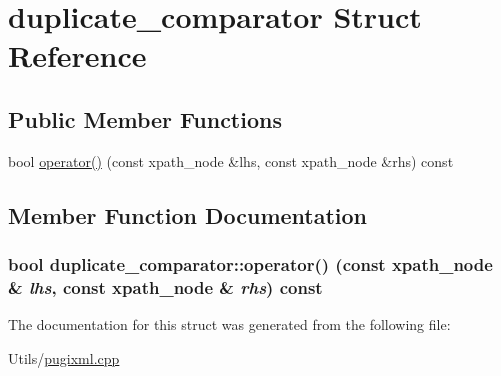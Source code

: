 \hypertarget{structduplicate__comparator}{
\section{duplicate\_\-comparator Struct Reference}
\label{structduplicate__comparator}
}
\subsection*{Public Member Functions}
\begin{CompactItemize}
\item 
bool \hyperlink{structduplicate__comparator_fa36b2cf7af3e0bc7e41b03995bd99d3}{operator()} (const xpath\_\-node \&lhs, const xpath\_\-node \&rhs) const 
\end{CompactItemize}


\subsection{Member Function Documentation}
\hypertarget{structduplicate__comparator_fa36b2cf7af3e0bc7e41b03995bd99d3}{
\subsubsection[operator()]{\setlength{\rightskip}{0pt plus 5cm}bool duplicate\_\-comparator::operator() (const xpath\_\-node \& {\em lhs}, const xpath\_\-node \& {\em rhs}) const}}
\label{structduplicate__comparator_fa36b2cf7af3e0bc7e41b03995bd99d3}




The documentation for this struct was generated from the following file:\begin{CompactItemize}
\item 
Utils/\hyperlink{pugixml_8cpp}{pugixml.cpp}\end{CompactItemize}

